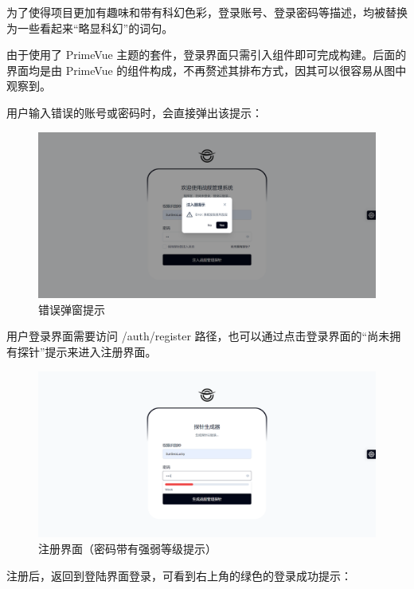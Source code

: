 \documentclass{base}
\begin{document}
为了使得项目更加有趣味和带有科幻色彩，登录账号、登录密码等描述，均被替换为一些看起来“略显科幻”的词句。

由于使用了 PrimeVue 主题的套件，登录界面只需引入组件即可完成构建。后面的界面均是由 PrimeVue 的组件构成，不再赘述其排布方式，因其可以很容易从图中观察到。

用户输入错误的账号或密码时，会直接弹出该提示：

\begin{figure}[H]
	\centering
	\includegraphics[width=\linewidth]{images/ErrorMsgBox}
	\caption{错误弹窗提示}
	\label{fig:errormsgbox}
\end{figure}

用户登录界面需要访问 /auth/register 路径，也可以通过点击登录界面的“尚未拥有探针”提示来进入注册界面。

\begin{figure}[H]
	\centering
	\includegraphics[width=\linewidth]{images/RegisterPage}
	\caption{注册界面（密码带有强弱等级提示）}
	\label{fig:registerpage}
\end{figure}

注册后，返回到登陆界面登录，可看到右上角的绿色的登录成功提示：
\end{document}
